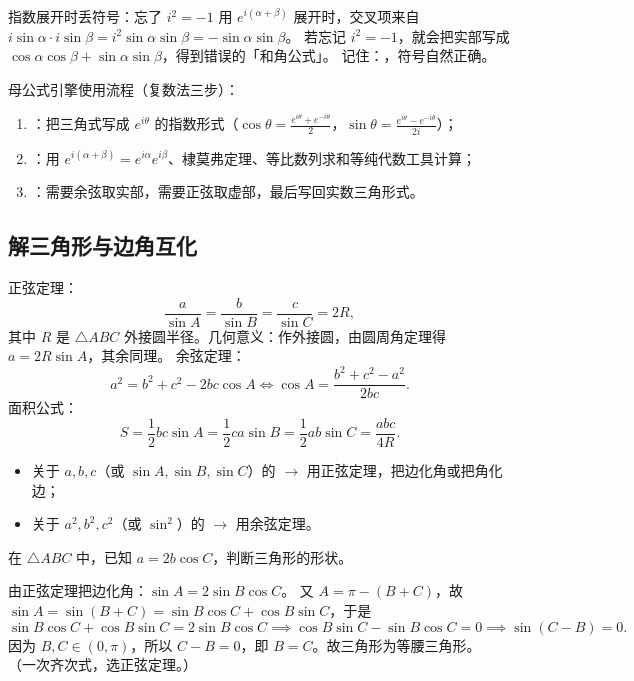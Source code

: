 \begin{explore}
\begin{commonerror}{指数展开时丢符号：忘了 $i^2=-1$}
用 $e^{i(\alpha+\beta)}$ 展开时，交叉项来自 $i\sin\alpha\cdot i\sin\beta=i^2\sin\alpha\sin\beta=-\sin\alpha\sin\beta$。
若忘记 $i^2=-1$，就会把实部写成 $\cos\alpha\cos\beta+\sin\alpha\sin\beta$，得到错误的「和角公式」。
记住：，符号自然正确。
\end{commonerror}

\begin{method}
母公式引擎使用流程（复数法三步）：
\begin{enumerate}
  \item {}：把三角式写成 $e^{i\theta}$ 的指数形式（$\cos\theta=\frac{e^{i\theta}+e^{-i\theta}}2$，$\sin\theta=\frac{e^{i\theta}-e^{-i\theta}}{2i}$）；
  \item {}：用 $e^{i(\alpha+\beta)}=e^{i\alpha}e^{i\beta}$、棣莫弗定理、等比数列求和等纯代数工具计算；
  \item {}：需要余弦取实部，需要正弦取虚部，最后写回实数三角形式。
\end{enumerate}
\end{method}

\subsection{解三角形与边角互化}

正弦定理：
\[
  \frac{a}{\sin A}=\frac{b}{\sin B}=\frac{c}{\sin C}=2R,
\]
其中 $R$ 是 $\triangle ABC$ 外接圆半径。几何意义：作外接圆，由圆周角定理得 $a=2R\sin A$，其余同理。
余弦定理：
\[
  a^2=b^2+c^2-2bc\cos A
  \iff \cos A=\frac{b^2+c^2-a^2}{2bc}.
\]
面积公式：
\[
  S=\frac12bc\sin A=\frac12ca\sin B=\frac12ab\sin C=\frac{abc}{4R}.
\]

\begin{itemize}
  \item 关于 $a,b,c$（或 $\sin A,\sin B,\sin C$）的 $\to$ 用正弦定理，把边化角或把角化边；
  \item 关于 $a^2,b^2,c^2$（或 $\sin^2$）的 $\to$ 用余弦定理。
\end{itemize}

\begin{example}
在 $\triangle ABC$ 中，已知 $a=2b\cos C$，判断三角形的形状。
\end{example}
\begin{solution}
由正弦定理把边化角：$\sin A=2\sin B\cos C$。
又 $A=\pi-(B+C)$，故 $\sin A=\sin(B+C)=\sin B\cos C+\cos B\sin C$，于是
\[
  \sin B\cos C+\cos B\sin C=2\sin B\cos C
  \implies \cos B\sin C-\sin B\cos C=0
  \implies \sin(C-B)=0.
\]
因为 $B,C\in(0,\pi)$，所以 $C-B=0$，即 $B=C$。故三角形为等腰三角形。
（一次齐次式，选正弦定理。）
\end{solution}


\end{explore}
